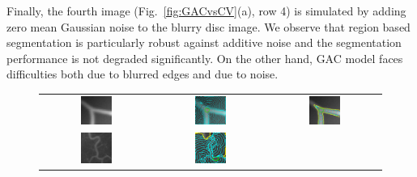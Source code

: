 Finally, the fourth image (Fig.~\ref{fig:GACvsCV}(a), row 4) is simulated by adding zero mean Gaussian noise to the blurry disc image. We observe that region based segmentation is particularly robust against additive noise and the segmentation performance is not degraded significantly. On the other hand, GAC model faces difficulties both due to blurred edges and due to noise.
\begin{figure}[t]
\centering
\renewcommand{\tabcolsep}{0.05cm}
\begin{tabular}{@{}ccc@{}}
\includegraphics[width=0.3\textwidth]{images/L2S_compare/orig_1}	&
\includegraphics[width=0.3\textwidth]{images/L2S_compare/GAC_1}	&
\includegraphics[width=0.3\textwidth]{images/L2S_compare/CV_1}	\\
\includegraphics[width=0.3\textwidth]{images/L2S_compare/orig_4}	&
\includegraphics[width=0.3\textwidth]{images/L2S_compare/GAC_4}	&

\end{tabular}
\end{figure}

